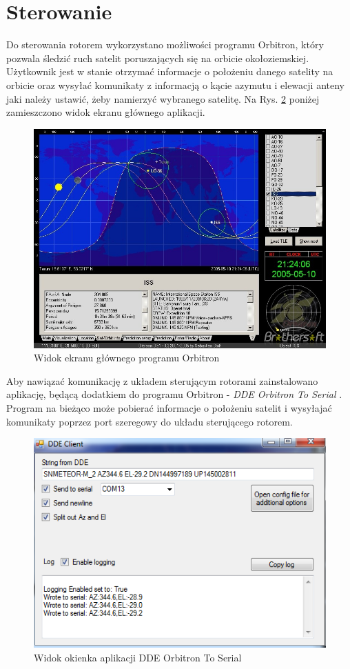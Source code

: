 \section{Sterowanie}

Do sterowania rotorem wykorzystano możliwości programu Orbitron, który pozwala śledzić ruch satelit poruszających się na orbicie okołoziemskiej. Użytkownik jest w stanie otrzymać informacje o położeniu danego satelity na orbicie oraz wysyłać komunikaty z informacją o kącie azymutu i elewacji anteny jaki należy ustawić, żeby namierzyć wybranego satelitę. Na Rys. \ref{fig:rotor} poniżej zamieszczono widok ekranu głównego aplikacji. 

\begin{figure}[h]
	\centering
		\includegraphics[width=0.7 \textwidth]{orbitron}
	\caption{Widok ekranu głównego programu Orbitron}	
	\label{fig:rotor}
\end{figure}

Aby nawiązać komunikację z układem sterującym rotorami zainstalowano aplikację, będącą dodatkiem do programu Orbitron - \textit{DDE Orbitron To Serial} \cite{dde}. Program na bieżąco może pobierać informacje o położeniu satelit i wysyłajać komunikaty poprzez port szeregowy do układu sterującego rotorem.


\begin{figure}[h]
	\centering
		\includegraphics[width=0.7 \textwidth]{DDEOrbitronToSerialScreenShot}
	\caption{Widok okienka aplikacji DDE Orbitron To Serial}	
	\label{fig:rotor}
\end{figure}

